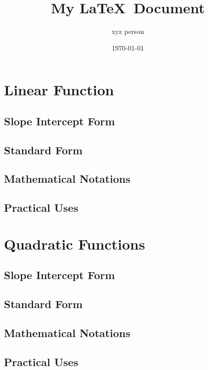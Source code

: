 \documentclass[12pt]{article}%
\title{My \LaTeX\ Document}%
\author {xyz person}%
\date{\today}%
\begin{document}
%
\normalsize%
\maketitle%
\tableofcontents%
\section{Linear Function}%
\label{sec:LinearFunction}%
\subsection{Slope Intercept Form}%
\label{subsec:SlopeInterceptForm}%

%
\subsection{Standard Form}%
\label{subsec:StandardForm}%

%
\subsection{Mathematical Notations}%
\label{subsec:MathematicalNotations}%

%
\subsection{Practical Uses}%
\label{subsec:PracticalUses}%

%
\section{Quadratic Functions}%
\label{sec:QuadraticFunctions}%
\subsection{Slope Intercept Form}%
\label{subsec:SlopeInterceptForm}%

%
\subsection{Standard Form}%
\label{subsec:StandardForm}%

%
\subsection{Mathematical Notations}%
\label{subsec:MathematicalNotations}%

%
\subsection{Practical Uses}%
\label{subsec:PracticalUses}%
\end{document}
